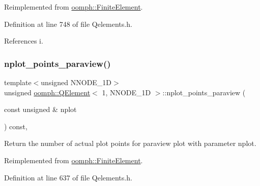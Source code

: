 Reimplemented from \hyperlink{classoomph_1_1FiniteElement_a8ed563c7ff0cfd8bafdbb0132b388106}{oomph\+::\+Finite\+Element}.



Definition at line 748 of file Qelements.\+h.



References i.

\mbox{\label{classoomph_1_1QElement_3_011_00_01NNODE__1D_01_4_a78c29fc6ff2fa0651a65b7d3e300cb7f}} 
\subsubsection{\texorpdfstring{nplot\+\_\+points\+\_\+paraview()}{nplot\_points\_paraview()}}
{\footnotesize\ttfamily template$<$unsigned N\+N\+O\+D\+E\+\_\+1D$>$ \\
unsigned \hyperlink{classoomph_1_1QElement}{oomph\+::\+Q\+Element}$<$ 1, N\+N\+O\+D\+E\+\_\+1D $>$\+::nplot\+\_\+points\+\_\+paraview (\begin{DoxyParamCaption}\item[{const unsigned \&}]{nplot }\end{DoxyParamCaption}) const\hspace{0.3cm}{\ttfamily [inline]}, {\ttfamily [virtual]}}



Return the number of actual plot points for paraview plot with parameter nplot. 



Reimplemented from \hyperlink{classoomph_1_1FiniteElement_a06d32c85753a1e302c3b345ea27f6c85}{oomph\+::\+Finite\+Element}.



Definition at line 637 of file Qelements.\+h.

\mbox{\label{classoomph_1_1QElement_3_011_00_01NNODE__1D_01_4_acae0f2a725ee8e87632e8f4e0fd9ae40}} 
